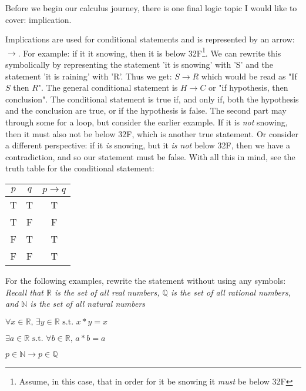 \documentclass[addpoints]{exam}
\newcommand{\st}{\text{ s.t. }}
\newcommand{\qspace}{\vspace{\stretch{1}}}
\begin{document}
Before we begin our calculus journey, there is one final logic topic I would like to cover: implication. 

\begin{tcolorbox}[title=IMPLIES,colframe=black,sharp corners,colback=white,colbacktitle=white,coltitle=black]
  Implications are used for conditional statements and is represented by an arrow: $\to$. For example: if it it snowing, then it is below 32\degree F\footnote{Assume, in this case, that in order for it be snowing it \textit{must} be below 32\degree F}. We can rewrite this symbolically by representing the statement 'it is snowing' with 'S' and the statement 'it is raining' with 'R'. Thus we get: $S \to R$ which would be read as "If $S$ then $R$". The general conditional statement is $H \to C$ or "if hypothesis, then conclusion". The conditional statement is true if, and only if, both the hypothesis and the conclusion are true, or if the hypothesis is false. The second part may through some for a loop, but consider the earlier example. If it is \textit{not} snowing, then it must also not be below 32\degree F, which is another true statement. Or consider a different perspective: if it \textit{is} snowing, but it \textit{is not} below 32\degree F, then we have a contradiction, and so our statement must be false. With all this in mind, see the truth table for the conditional statement: 
  \vspace{0.01in}
  \begin{center}
    \begin{tabular}{ |c|c|c| } 
      \hline
      $p$ & $q$ & $p \to q$ \\ 
      \hline
      T & T & T \\ 
      T & F & F \\ 
      F & T & T \\ 
      F & F & T \\ 
      \hline
    \end{tabular}
  \end{center}
  \vspace{0.01in}
\end{tcolorbox}

For the following examples, rewrite the statement without using any symbols: \\
\small \textit{Recall that $\mathbb{R}$ is the set of all real numbers, $\mathbb{Q}$ is the set of all rational numbers, and $\mathbb{N}$ is the set of all natural numbers}
\begin{questions}
  \question $\forall x \in \mathbb{R}\text{, } \exists y \in \mathbb{R} \st x * y = x$
  \qspace 
  
  \question $\exists a \in \mathbb{R} \st \forall b \in \mathbb{R}\text{, } a * b = a$ 
  \qspace

  \question $p \in \mathbb{N} \to p \in \mathbb{Q}$
  \qspace
\end{questions}
\end{document}

